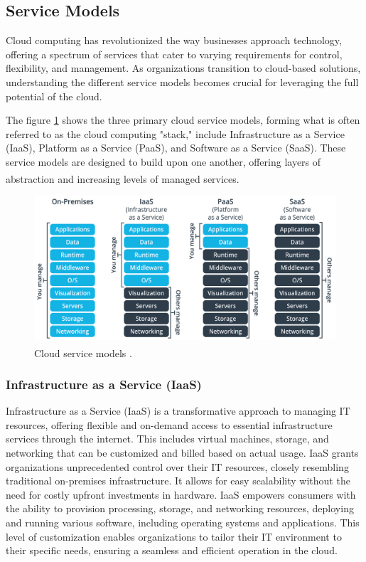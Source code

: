\subsection{Service Models}
Cloud computing has revolutionized the way businesses approach technology, offering a spectrum of
services that cater to varying requirements for control, flexibility, and management. As
organizations transition to cloud-based solutions, understanding the different service models
becomes crucial for leveraging the full potential of the cloud.

The figure \ref{fig:3_cloud_models} shows the three primary cloud service models, forming what is
often referred to as the cloud computing "stack," include Infrastructure as a Service (IaaS),
Platform as a Service (PaaS), and Software as a Service (SaaS). These service models are designed to
build upon one another, offering layers of abstraction and increasing levels of managed
services\textsuperscript{\cite{cloud_amazon}}.

\begin{figure}
    \centering
    \includegraphics[scale=0.25]{Pictures/3_cloud_models.png}
    \caption{Cloud service models \textsuperscript{\cite{cloud_models}}.}
    \label{fig:3_cloud_models}
\end{figure}

\subsubsection{Infrastructure as a Service (IaaS)}
Infrastructure as a Service (IaaS) is a transformative approach to managing IT resources, offering
flexible and on-demand access to essential infrastructure services through the internet. This
includes virtual machines, storage, and networking that can be customized and billed based on actual
usage. IaaS grants organizations unprecedented control over their IT resources, closely resembling
traditional on-premises infrastructure. It allows for easy scalability without the need for costly
upfront investments in hardware. IaaS empowers consumers with the ability to provision processing,
storage, and networking resources, deploying and running various software, including operating
systems and applications. This level of customization enables organizations to tailor their IT
environment to their specific needs, ensuring a seamless and efficient operation in the cloud.

